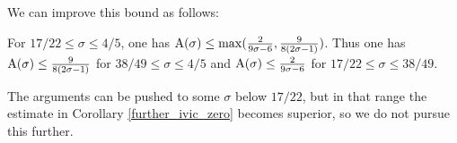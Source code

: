 We can improve this bound as follows:

\begin{theorem}\label{bourgain-density-improved} For $17/22 \leq \sigma \leq 4/5$, one has $\mathrm{A}(\sigma) \leq \max( \frac{2}{9\sigma-6}, \frac{9}{8(2\sigma-1)} )$.  Thus one has $\mathrm{A}(\sigma) \leq \frac{9}{8(2\sigma-1)}$ for $38/49 \leq \sigma \leq 4/5$ and $\mathrm{A}(\sigma) \leq \frac{2}{9\sigma-6}$ for $17/22 \leq \sigma \leq 38/49$.
\end{theorem}
\derived
{}

The arguments can be pushed to some $\sigma$ below $17/22$, but in that range the estimate in Corollary \ref{further_ivic_zero} becomes superior, so we do not pursue this further.

